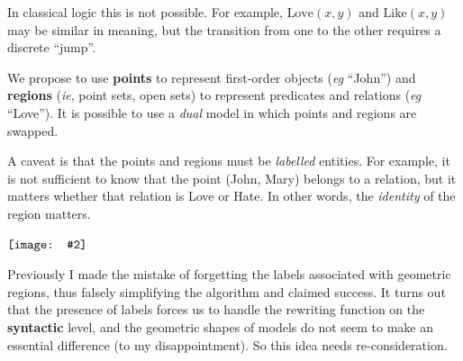 \documentclass[12pt, orivec]{article}
\newcommand*\NewSym[2][0.5]{\vcenter{\hbox{\texttt{[image: \#2]}}}}
\begin{document}
In classical logic this is not possible.  For example, $\mbox{Love}(x,y)$ and $\mbox{Like}(x,y)$ may be similar in meaning, but the transition from one to the other requires a discrete ``jump''.

We propose to use \textbf{points} to represent first-order objects (\textit{eg} ``John'') and \textbf{regions} (\textit{ie}, point sets, open sets) to represent predicates and relations (\textit{eg} ``Love'').  It is possible to use a \textit{dual} model in which points and regions are swapped.

A caveat is that the points and regions must be \textit{labelled} entities.  For example, it is not sufficient to know that the point (John, Mary) belongs to a relation, but it matters whether that relation is Love or Hate.  In other words, the \textit{identity} of the region matters.

\footnotesize
$\NewSym{../UnderConst.png}$ \quad \parbox{0.9\textwidth}{
Previously I made the mistake of forgetting the labels associated with geometric regions, thus falsely simplifying the algorithm and claimed success.  It turns out that the presence of labels forces us to handle the rewriting function on the \textbf{syntactic} level, and the geometric shapes of models do not seem to make an essential difference (to my disappointment).  So this idea needs re-consideration.  }
\normalsize

\end{document}
